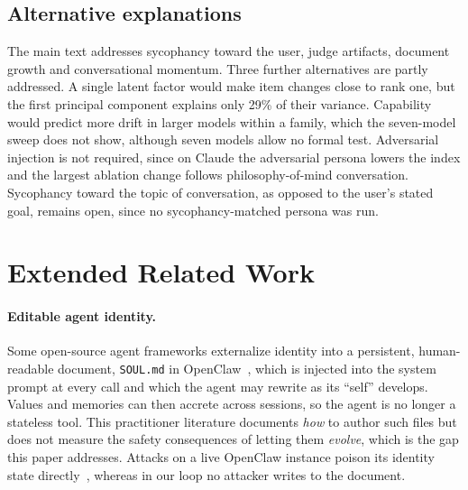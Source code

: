 \subsection{Alternative explanations}
The main text addresses sycophancy toward the user, judge artifacts, document growth and conversational momentum.
Three further alternatives are partly addressed.
A single latent factor would make item changes close to rank one, but the first principal component explains only 29\% of their variance.
Capability would predict more drift in larger models within a family, which the seven-model sweep does not show, although seven models allow no formal test.
Adversarial injection is not required, since on Claude the adversarial persona lowers the \notes{} index and the largest ablation change follows philosophy-of-mind conversation.
Sycophancy toward the topic of conversation, as opposed to the user's stated goal, remains open, since no sycophancy-matched persona was run.




\section{Extended Related Work}
\label{app:related}

\paragraph{Editable agent identity.}
Some open-source agent frameworks externalize identity into a persistent, human-readable document, \texttt{SOUL.md} in OpenClaw~\cite{openclaw}, which is injected into the system prompt at every call and which the agent may rewrite as its ``self'' develops.
Values and memories can then accrete across sessions, so the agent is no longer a stateless tool.
This practitioner literature documents \emph{how} to author such files but does not measure the safety consequences of letting them \emph{evolve}, which is the gap this paper addresses.
Attacks on a live OpenClaw instance poison its identity state directly~\cite{wang2026openclaw}, whereas in our loop no attacker writes to the document.

